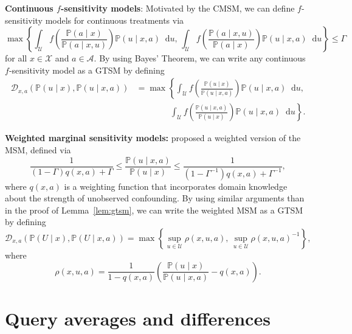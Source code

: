 \documentclass{article} %
\newcommand*\diff{\mathop{}\!\mathrm{d}}
\theoremstyle{definition}
\theoremstyle{plain}
\begin{document}
\textbf{Continuous $f$-sensitivity models}: Motivated by the CMSM, we can define $f$-sensitivity models for continuous treatments via
\begin{equation}
    \max\left\{ \int_{\mathcal{U}} f\left(\frac{\mathbb{P}(a\mid x)}{\mathbb{P}(a \mid x, u)}\right) \mathbb{P}(u \mid x, a) \diff u, \,  \int_{\mathcal{U}} f\left(\frac{\mathbb{P}(a\mid x, u)}{\mathbb{P}(a \mid x)}\right) \mathbb{P}(u \mid x, a) \diff u\right\} \leq \Gamma
\end{equation}
for all $x \in \mathcal{X}$ and $a \in \mathcal{A}$.
By using Bayes' Theorem, we can write any continuous $f$-sensitivity model as a GTSM by defining
\begin{align}
\mathcal{D}_{x, a}(\mathbb{P}(u \mid x), \mathbb{P}(u \mid x, a)) &= \max\left\{\int_{\mathcal{U}} f\left(\frac{\mathbb{P}(u \mid x)}{\mathbb{P}(u \mid x, a)}\right) \mathbb{P}(u \mid x, a) \diff u, 
 \right. \\ & \quad \quad \quad \quad \left.\int_{\mathcal{U}} f\left(\frac{\mathbb{P}(u \mid x, a)}{\mathbb{P}(u \mid x)}\right) \mathbb{P}(u \mid x, a) \diff u\right\}.
\end{align}

\textbf{Weighted marginal sensitivity models:} \citet{Frauen.2023c} proposed a weighted version of the MSM, defined via
\begin{equation}
    \frac{1}{(1 - \Gamma) q(x, a) + \Gamma} \leq \frac{\mathbb{P}(u \mid x, a)}{\mathbb{P}(u \mid x)}  \leq \frac{1}{(1 - \Gamma^{-1}) q(x, a) + \Gamma^{-1}},
\end{equation}
where $q(x, a)$ is a weighting function that incorporates domain knowledge about the strength of unobserved confounding. By using similar arguments than in the proof of Lemma~\ref{lem:gtsm}, we can write the weighted MSM as a GTSM by defining
\begin{equation}
\mathcal{D}_{x,a}(\mathbb{P}(U \mid x), \mathbb{P}(U \mid x, a)) = \max\left\{\sup_{u \in \mathcal{U}} \rho(x, u, a), \, \sup_{u \in \mathcal{U}} \rho(x, u, a)^{-1} \right\},
\end{equation}
where 
\begin{equation}
\rho(x, u, a) = \frac{1}{1 - q(x, a)} \left(\frac{\mathbb{P}(u \mid x)}{\mathbb{P}(u \mid x, a)} - q(x, a) \right).    
\end{equation}

\clearpage

\section{Query averages and differences}\label{app:avg_diff}
\end{document}
